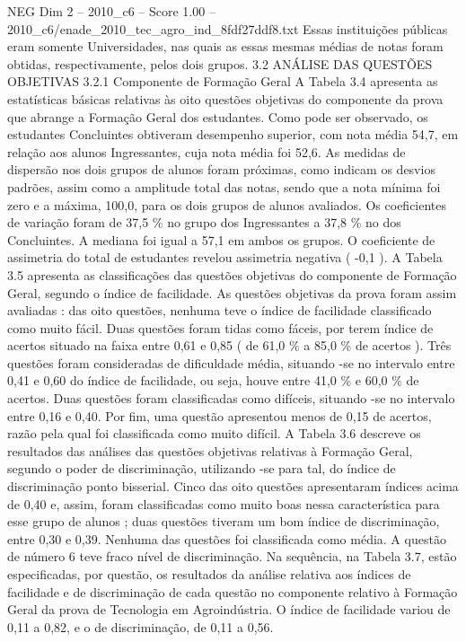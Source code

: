 \begin{textsample}{NEG Dim 2 – 2010\_c6 – Score 1.00 – 2010\_c6/enade\_2010\_tec\_agro\_ind\_8fdf27ddf8.txt}
Essas instituições públicas eram somente Universidades, nas quais as essas mesmas médias de notas foram obtidas, respectivamente, pelos dois grupos. 3.2 ANÁLISE DAS QUESTÕES OBJETIVAS 3.2.1 Componente de Formação Geral A Tabela 3.4 apresenta as estatísticas básicas relativas às oito questões objetivas do componente da prova que abrange a Formação Geral dos estudantes.
Como pode ser observado, os estudantes Concluintes obtiveram desempenho superior, com nota média 54,7, em relação aos alunos Ingressantes, cuja nota média foi 52,6.
As medidas de dispersão nos dois grupos de alunos foram próximas, como indicam os desvios padrões, assim como a amplitude total das notas, sendo que a nota mínima foi zero e a máxima, 100,0, para os dois grupos de alunos avaliados.
Os coeficientes de variação foram de 37,5 \% no grupo dos Ingressantes a 37,8 \% no dos Concluintes.
A mediana foi igual a 57,1 em ambos os grupos.
O coeficiente de assimetria do total de estudantes revelou assimetria negativa ( -0,1 ).
A Tabela 3.5 apresenta as classificações das questões objetivas do componente de Formação Geral, segundo o índice de facilidade.
As questões objetivas da prova foram assim avaliadas : das oito questões, nenhuma teve o índice de facilidade classificado como muito fácil.
Duas questões foram tidas como fáceis, por terem índice de acertos situado na faixa entre 0,61 e 0,85 ( de 61,0 \% a 85,0 \% de acertos ).
Três questões foram consideradas de dificuldade média, situando -se no intervalo entre 0,41 e 0,60 do índice de facilidade, ou seja, houve entre 41,0 \% e 60,0 \% de acertos.
Duas questões foram classificadas como difíceis, situando -se no intervalo entre 0,16 e 0,40.
Por fim, uma questão apresentou menos de 0,15 de acertos, razão pela qual foi classificada como muito difícil.
A Tabela 3.6 descreve os resultados das análises das questões objetivas relativas à Formação Geral, segundo o poder de discriminação, utilizando -se para tal, do índice de discriminação ponto bisserial.
Cinco das oito questões apresentaram índices acima de 0,40 e, assim, foram classificadas como muito boas nessa característica para esse grupo de alunos ; duas questões tiveram um bom índice de discriminação, entre 0,30 e 0,39.
Nenhuma das questões foi classificada como média.
A questão de número 6 teve fraco nível de discriminação.
Na sequência, na Tabela 3.7, estão especificadas, por questão, os resultados da análise relativa aos índices de facilidade e de discriminação de cada questão no componente relativo à Formação Geral da prova de Tecnologia em Agroindústria.
O índice de facilidade variou de 0,11 a 0,82, e o de discriminação, de 0,11 a 0,56.

\end{textsample}
